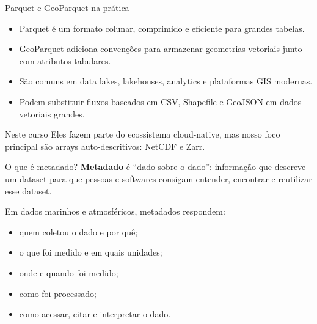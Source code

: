 \documentclass[aspectratio=169]{beamer}
\begin{document}
\begin{frame}{Parquet e GeoParquet na prática}
\begin{itemize}
  \item Parquet é um formato colunar, comprimido e eficiente para grandes tabelas.
  \item GeoParquet adiciona convenções para armazenar geometrias vetoriais junto com atributos tabulares.
  \item São comuns em data lakes, lakehouses, analytics e plataformas GIS modernas.
  \item Podem substituir fluxos baseados em CSV, Shapefile e GeoJSON em dados vetoriais grandes.
\end{itemize}

\vspace{0.4cm}

\begin{block}{Neste curso}
Eles fazem parte do ecossistema cloud-native, mas nosso foco principal são arrays auto-descritivos: NetCDF e Zarr.
\end{block}
\end{frame}

\begin{frame}{O que é metadado?}
\Large
\textbf{Metadado} é ``dado sobre o dado'': informação que descreve um dataset para que pessoas e softwares consigam entender, encontrar e reutilizar esse dataset.

\vspace{0.4cm}

Em dados marinhos e atmosféricos, metadados respondem:

\begin{itemize}
  \item quem coletou o dado e por quê;
  \item o que foi medido e em quais unidades;
  \item onde e quando foi medido;
  \item como foi processado;
  \item como acessar, citar e interpretar o dado.
\end{itemize}
\end{frame}
\end{document}
